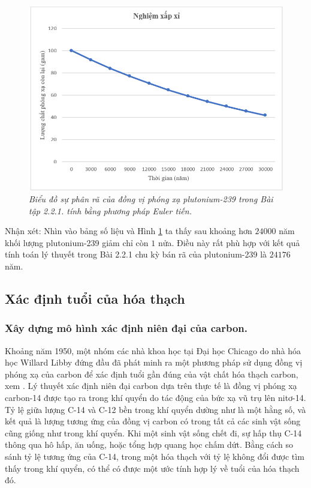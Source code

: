 \begin{figure}[!ht]
	\centering
	\includegraphics[scale=0.65]{Images/hinh_2_3.png}
	\caption[Biểu đồ sự phân rã của đồng vị phóng xạ plutonium-239 trong Bài tập 2.2.1. tính bằng phương pháp Euler tiến.]{\itshape\fontsize{13pt}{0pt}\selectfont\centering Biểu đồ sự phân rã của đồng vị phóng xạ plutonium-239 trong Bài tập 2.2.1. tính bằng phương pháp Euler tiến.}
	\label{hinh2.3}
\end{figure}
\noindent Nhận xét: Nhìn vào bảng số liệu và Hình \ref{hinh2.3} ta thấy sau khoảng hơn $24000$ năm khối lượng plutonium-239 giảm chỉ còn $1$ nửa. Điều này rất phù hợp với kết quả tính toán lý thuyết trong Bài 2.2.1 chu kỳ bán rã của plutonium-239 là $24176$ năm.    
\subsection{Xác định tuổi của hóa thạch}    
\subsubsection{Xây dựng mô hình xác định niên đại của carbon.}
Khoảng năm 1950, một nhóm các nhà khoa học tại Đại học Chicago do nhà hóa học Willard Libby đứng đầu đã phát minh ra một phương pháp sử dụng đồng vị phóng xạ của carbon để xác định tuổi gần đúng của vật chất hóa thạch carbon, xem \cite{ref7}. Lý thuyết xác định niên đại carbon dựa trên thực tế là đồng vị phóng xạ carbon-14 được tạo ra trong khí quyển do tác động của bức xạ vũ trụ lên nitơ-14. Tỷ lệ giữa lượng 
C-14 và C-12 bền trong khí quyển dường như là một hằng số, và kết quả là lượng tương ứng của đồng vị carbon có trong tất cả các sinh vật sống cũng giống như trong khí quyển. Khi một sinh vật sống chết đi, sự hấp thụ C-14 thông qua hô hấp, ăn uống, hoặc tổng hợp quang học chấm dứt. Bằng cách so sánh tỷ lệ tương ứng của C-14, trong một hóa thạch với tỷ lệ không đổi được tìm thấy trong khí quyển, có thể có được một ước tính hợp lý về tuổi của hóa thạch đó.

